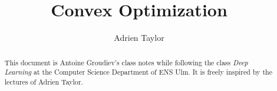 \documentclass[toc, titlepaged]{../cs-classes/cs-classes}
\title{Convex Optimization}
\author{Adrien Taylor}
\begin{document}
\begin{abstract}
    This document is Antoine Groudiev's class notes while following the class \emph{Deep Learning} at the Computer Science Department of ENS Ulm. It is freely inspired by the lectures of Adrien Taylor.
\end{abstract}





\end{document}

